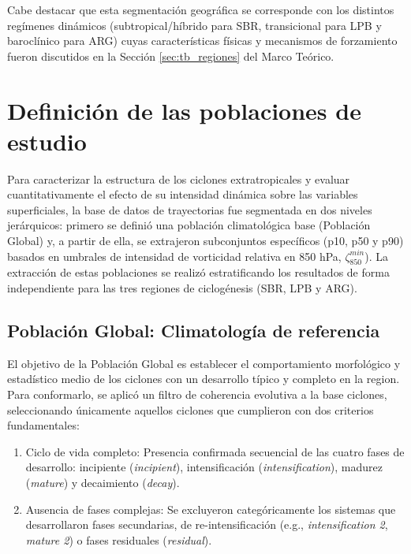 Cabe destacar que esta segmentación geográfica se corresponde con los distintos regímenes dinámicos (subtropical/híbrido para SBR, transicional para LPB y baroclínico para ARG) cuyas características físicas y mecanismos de forzamiento fueron discutidos en la Sección \ref{sec:tb_regiones} del Marco Teórico.

\section{Definición de las poblaciones de estudio}\label{sec:poblaciones_estudio}

Para caracterizar la estructura de los ciclones extratropicales y evaluar cuantitativamente el efecto de su intensidad dinámica sobre las variables superficiales, la base de datos de trayectorias fue segmentada en dos niveles jerárquicos: primero se definió una población climatológica base (Población Global) y, a partir de ella, se extrajeron subconjuntos específicos (p10, p50 y p90) basados en umbrales de intensidad de vorticidad relativa en 850 hPa, $\zeta_{850}^{min}$). La extracción de estas poblaciones se realizó estratificando los resultados de forma independiente para las tres regiones de ciclogénesis (SBR, LPB y ARG).

\subsection{Población Global: Climatología de referencia}\label{subsec:grupo_global}

El objetivo de la Población Global es establecer el comportamiento morfológico y estadístico medio de los ciclones con un desarrollo típico y completo en la region. Para conformarlo, se aplicó un filtro de coherencia evolutiva a la base ciclones, seleccionando únicamente aquellos ciclones que cumplieron con dos criterios fundamentales:

\begin{enumerate}
    \item Ciclo de vida completo: Presencia confirmada secuencial de las cuatro fases de desarrollo: incipiente (\textit{incipient}), intensificación (\textit{intensification}), madurez (\textit{mature}) y decaimiento (\textit{decay}).
    \item Ausencia de fases complejas: Se excluyeron categóricamente los sistemas que desarrollaron fases secundarias, de re-intensificación (e.g., \textit{intensification 2}, \textit{mature 2}) o fases residuales (\textit{residual}).
\end{enumerate}

